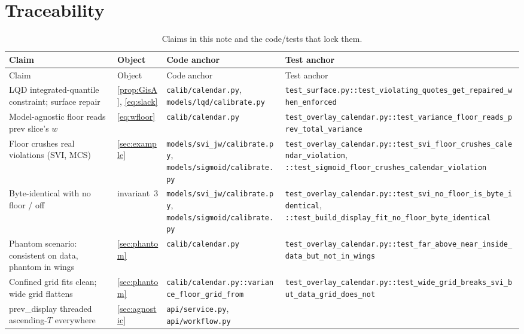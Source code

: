 \documentclass[11pt]{article}
\begin{document}
\section{Traceability}
\label{sec:traceability}

\begingroup
\small
\setlength{\tabcolsep}{3pt}
\begin{longtable}{@{}p{}p{}p{}p{}@{}}
\caption{Claims in this note and the code/tests that lock them.}\\
\toprule Claim & Object & Code anchor & Test anchor\\ \midrule
\endfirsthead
\toprule Claim & Object & Code anchor & Test anchor\\ \midrule
\endhead
LQD integrated-quantile constraint; surface repair &
\cref{prop:GisA}, \eqref{eq:slack} &
\nolinkurl{calib/calendar.py}, \nolinkurl{models/lqd/calibrate.py} &
\nolinkurl{test_surface.py::test_violating_quotes_get_repaired_when_enforced}\\
Model-agnostic floor reads prev slice's $w$ &
\eqref{eq:wfloor} &
\nolinkurl{calib/calendar.py} &
\nolinkurl{test_overlay_calendar.py::test_variance_floor_reads_prev_total_variance}\\
Floor crushes real violations (SVI, MCS) &
\cref{sec:example} &
\nolinkurl{models/svi_jw/calibrate.py}, \nolinkurl{models/sigmoid/calibrate.py} &
\nolinkurl{test_overlay_calendar.py::test_svi_floor_crushes_calendar_violation}, \nolinkurl{::test_sigmoid_floor_crushes_calendar_violation}\\
Byte-identical with no floor / off &
invariant~3 &
\nolinkurl{models/svi_jw/calibrate.py}, \nolinkurl{models/sigmoid/calibrate.py} &
\nolinkurl{test_overlay_calendar.py::test_svi_no_floor_is_byte_identical}, \nolinkurl{::test_build_display_fit_no_floor_byte_identical}\\
Phantom scenario: consistent on data, phantom in wings &
\cref{sec:phantom} &
\nolinkurl{calib/calendar.py} &
\nolinkurl{test_overlay_calendar.py::test_far_above_near_inside_data_but_not_in_wings}\\
Confined grid fits clean; wide grid flattens &
\cref{sec:phantom} &
\nolinkurl{calib/calendar.py::variance_floor_grid_from} &
\nolinkurl{test_overlay_calendar.py::test_wide_grid_breaks_svi_but_data_grid_does_not}\\
prev\_display threaded ascending-$T$ everywhere &
\cref{sec:agnostic} &
\nolinkurl{api/service.py}, \nolinkurl{api/workflow.py} &

\end{longtable}
\end{document}
